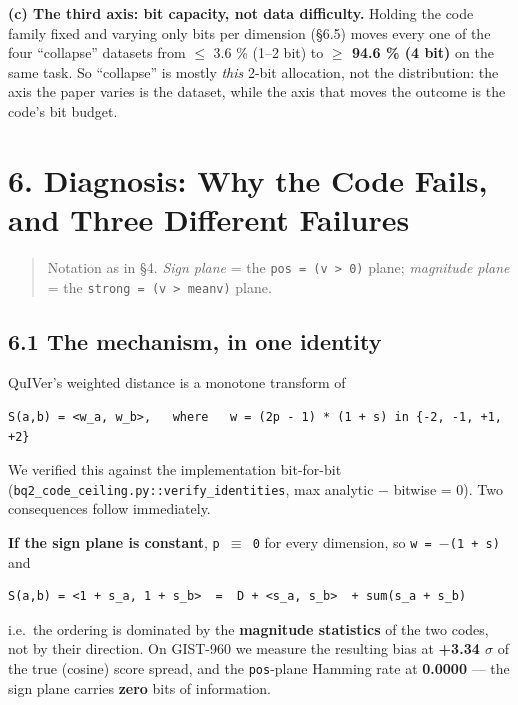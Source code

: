 \documentclass[
  10pt,
]{article}
\begin{document}
\textbf{(c) The third axis: bit capacity, not data difficulty.} Holding
the code family fixed and varying only bits per dimension (§6.5) moves
every one of the four ``collapse'' datasets from $\leq$ 3.6 \% (1--2 bit) to
\textbf{$\geq$ 94.6 \% (4 bit)} on the same task. So ``collapse'' is mostly
\emph{this} 2-bit allocation, not the distribution: the axis the paper
varies is the dataset, while the axis that moves the outcome is the
code's bit budget.

\section{6. Diagnosis: Why the Code Fails, and Three Different
Failures}\label{diagnosis-why-the-code-fails-and-three-different-failures}

\begin{quote}
Notation as in §4. \emph{Sign plane} = the
\texttt{pos\ =\ (v\ \textgreater{}\ 0)} plane; \emph{magnitude plane} =
the
\texttt{strong\ =\ (\textbar{}v\textbar{}\ \textgreater{}\ mean\textbar{}v\textbar{})}
plane.
\end{quote}

\subsection{6.1 The mechanism, in one
identity}\label{the-mechanism-in-one-identity}

QuIVer's weighted distance is a monotone transform of

\begin{verbatim}
S(a,b) = <w_a, w_b>,   where   w = (2p - 1) * (1 + s) in {-2, -1, +1, +2}
\end{verbatim}

We verified this against the implementation bit-for-bit
(\texttt{bq2\_code\_ceiling.py::verify\_identities}, max
\textbar analytic $-$ bitwise\textbar{} = 0). Two consequences follow
immediately.

\textbf{If the sign plane is constant}, \texttt{p\ $\equiv$\ 0} for every
dimension, so \texttt{w\ =\ $-$(1\ +\ s)} and

\begin{verbatim}
S(a,b) = <1 + s_a, 1 + s_b>  =  D + <s_a, s_b>  + sum(s_a + s_b)
\end{verbatim}

i.e.~the ordering is dominated by the \textbf{magnitude statistics} of
the two codes, not by their direction. On GIST-960 we measure the
resulting bias at \textbf{+3.34 $\sigma$} of the true (cosine) score spread,
and the \texttt{pos}-plane Hamming rate at \textbf{0.0000} --- the sign
plane carries \textbf{zero} bits of information.
\end{document}

